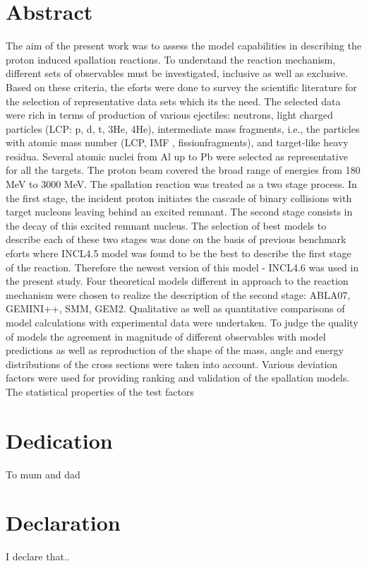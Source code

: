 \documentclass[12pt]{report}
\begin{document}

\tableofcontents
\chapter*{Abstract}
The aim of the present work was to assess the model capabilities in describing the proton induced spallation reactions. To understand the reaction mechanism, different sets of observables must be investigated, inclusive as well as exclusive. Based on these criteria, the eforts were done to survey the scientific literature for the selection of representative  data sets which its the need. The selected data were rich in terms of production of various ejectiles: neutrons, light charged particles (LCP: p, d, t, 3He, 4He), intermediate mass fragments, i.e., the particles with atomic mass number (LCP, IMF , fissionfragments), and target-like heavy residua. Several atomic nuclei from Al up to Pb were selected as representative for all the targets. The proton beam covered the broad range of energies from 180 MeV to 3000 MeV. The spallation reaction was treated as a two stage process. In the first stage, the incident proton initiates the cascade of binary collisions with target nucleons leaving
behind an excited remnant. The second stage consists in the decay of this excited remnant nucleus. The selection of best models to describe each of these two stages was done on
the basis of previous benchmark eforts where INCL4.5 model was found to be the best to describe the first stage of the reaction. Therefore the newest version of this model -
INCL4.6 was used in the present study. Four theoretical models different in approach  to the reaction mechanism were chosen to realize the description of the second stage: ABLA07, GEMINI++, SMM, GEM2. Qualitative as well as quantitative comparisons of model calculations with experimental data were undertaken. To judge the quality of models the agreement in magnitude of different observables with model predictions as
well as reproduction of the shape of the mass, angle and energy distributions of the cross sections were taken into account. Various deviation factors were used for providing ranking and validation of the spallation models. The statistical properties of the test factors
 
\chapter*{Dedication}
To mum and dad
 
\chapter*{Declaration}
I declare that..
 
\end{document}
